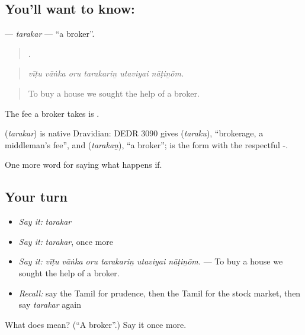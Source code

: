 \subsection*{You'll want to know: }
\textbf{} — \emph{tarakar} — \textquotedblleft{}a broker\textquotedblright{}.

\begin{quote}
     .
\end{quote}

\begin{quote}
\emph{vīṭu vāṅka oru tarakariṉ utaviyai nāṭiṉōm.}
\end{quote}

\begin{quote}
To buy a house we sought the help of a broker.
\end{quote}

The fee a broker takes is .

\begin{cousinweb}
\textbf{} (\emph{tarakar}) is native Dravidian: DEDR 3090 gives  (\emph{taraku}), \textquotedblleft{}brokerage, a middleman's fee\textquotedblright{}, and  (\emph{tarakaṉ}), \textquotedblleft{}a broker\textquotedblright{};  is the form with the respectful -.
\end{cousinweb}

\begin{grammarlens}[title={What you've built}]
One more word for saying what happens if.
\end{grammarlens}

\subsection*{Your turn}
\begin{itemize}
\raggedright
  \item \emph{Say it:} \emph{tarakar}
  \item \emph{Say it:} \emph{tarakar}, once more
  \item \emph{Say it:} \emph{vīṭu vāṅka oru tarakariṉ utaviyai nāṭiṉōm.} — To buy a house we sought the help of a broker.
  \item \emph{Recall:} say the Tamil for prudence, then the Tamil for the stock market, then say \emph{tarakar} again
\end{itemize}

\begin{tcolorbox}[breakable,colback=teal!4,colframe=teal!35!black,title={Before you move on}]
What does  mean? (\textquotedblleft{}A broker\textquotedblright{}.) Say it once more.
\end{tcolorbox}

